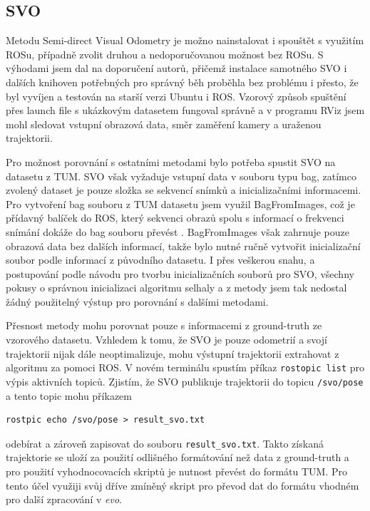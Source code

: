 \documentclass[12pt,a4paper]{report}
\begin{document}
\subsection{SVO}
Metodu Semi-direct Visual Odometry je možno nainstalovat i spouštět s využitím ROSu, případně zvolit druhou a nedoporučovanou možnost bez ROSu. S výhodami jsem dal na doporučení autorů, přičemž instalace samotného SVO i dalších knihoven potřebných pro správný běh proběhla bez problému i přesto, že byl vyvíjen a testován na starší verzi Ubuntu i ROS. Vzorový způsob spuštění přes launch file s ukázkovým datasetem fungoval správně a v programu RViz jsem mohl sledovat vstupní obrazová data, směr zaměření kamery a uraženou trajektorii. 

Pro možnost porovnání s ostatními metodami bylo potřeba spustit SVO na datasetu z TUM. SVO však vyžaduje vstupní data v souboru typu bag, zatímco zvolený dataset je pouze složka se sekvencí snímků a inicializačními informacemi. Pro vytvoření bag souboru z TUM datasetu jsem využil BagFromImages, což je přídavný balíček do ROS, který sekvenci obrazů spolu s informací o frekvenci snímání dokáže do bag souboru převést \cite{BagFromImages}. BagFromImages však zahrnuje pouze obrazová data bez dalších informací, takže bylo nutné ručně vytvořit inicializační soubor podle informací z původního datasetu. I přes veškerou snahu, a postupování podle návodu pro tvorbu inicializačních souborů pro SVO, všechny pokusy o správnou inicializaci algoritmu selhaly a z metody jsem tak nedostal žádný použitelný výstup pro porovnání s dalšími metodami.

Přesnost metody mohu porovnat pouze s informacemi z ground-truth ze vzorového datasetu. Vzhledem k tomu, že SVO je pouze odometrií a svojí trajektorii nijak dále neoptimalizuje, mohu výstupní trajektorii extrahovat z algoritmu za pomoci ROS. V novém terminálu spustím příkaz \texttt{rostopic list} pro výpis aktivních topiců. Zjistím, že SVO publikuje trajektorii do topicu \texttt{/svo/pose} a tento topic mohu příkazem 
\begin{verbatim}
rostpic echo /svo/pose > result_svo.txt
\end{verbatim}
 odebírat a zároveň zapisovat do souboru \texttt{result\_svo.txt}. Takto získaná trajektorie se uloží za použití odlišného formátování než data z ground-truth a pro použití vyhodnocovacích skriptů je nutnost převést do formátu TUM. Pro tento účel využiji svůj dříve zmíněný skript pro převod dat do formátu vhodném pro další zpracování v \textit{evo}.
\end{document}
